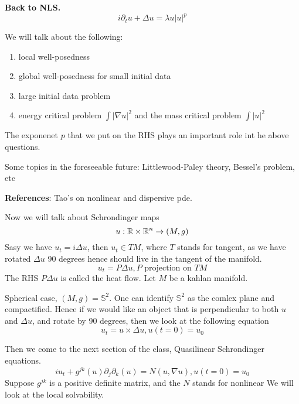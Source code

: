 \textbf{Back to NLS.}
\begin{equation*}
    i\partial_t u+\Delta u=\lambda u|u|^p
\end{equation*}

We will talk about the following:
\begin{enumerate}
    \item local well-posedness
    \item global well-posedness for small initial data
    \item large initial data problem 
    \item energy critical problem $\int|\nabla u|^2$ and the mass critical problem $\int|u|^2$
\end{enumerate}
\begin{remark}
    The exponenet $p$ that we put on the RHS plays an important role int he above questions.
\end{remark}
Some topics in the foreseeable future: Littlewood-Paley theory, Bessel's problem, etc

\textbf{References}: Tao's on nonlinear and dispersive pde.

Now we will talk about Schrondinger maps
\begin{equation*}
    u: \mathbb{R}\times \mathbb{R}^n\to (M, g)
\end{equation*}
Sasy we have $u_t=i\Delta u$, then $u_t\in TM$, where $T$ stands for tangent, as we have rotated $\Delta u$ 90 degrees hence should live in the tangent of the manifold.
\begin{equation*}
    u_t=P\Delta u, P \text{ projection on } TM
\end{equation*}
The RHS $P\Delta u$ is called the heat flow. Let $M$ be a kahlan manifold.

Spherical case, $(M,g)=\mathbb{S}^2$. One can identify $\mathbb{S}^2$ as the comlex plane and compactified.
Hence if we would like an object that is perpendicular to both $u$ and $\Delta u$, and rotate by 90 degrees, then we look at the following equation
\begin{equation*}
    u_t=u\times \Delta u, u(t=0)=u_0
\end{equation*}


Then we come to the next section of the class, Quasilinear Schrondinger equations.
\begin{equation*}
    iu_t+g^{jk}(u)\partial_j\partial_k(u)=N(u, \nabla u), u(t=0)=u_0
\end{equation*}
Suppose $g^{jk}$ is a positive definite matrix, and the $N$ stands for nonlinear We will look at the local solvability. 

